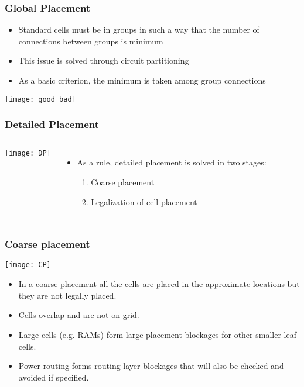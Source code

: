 \documentclass[compress]{beamer}
\begin{document}
\begin{frame}
	\frametitle{Global Placement}
	\begin{itemize}
		\item Standard cells must be in groups in such a way that the number of connections between groups is minimum
		\pause
		\item This issue is solved through circuit partitioning \pause
		\item As a basic criterion, the minimum is taken among group connections
	\end{itemize}
		\begin{center}
			\texttt{[image: good\_bad]}
		\end{center}
\end{frame}
\begin{frame}
	\frametitle{Detailed Placement}
	\begin{columns}	
		\begin{center}
			\texttt{[image: DP]}
		\end{center}
		\begin{itemize}
			\item As a rule, detailed placement is solved in two stages: 
			\begin{enumerate}
				\item Coarse placement
				\item Legalization of cell placement
			\end{enumerate}
		\end{itemize}
	\end{columns}
\end{frame}

\begin{frame}
	\frametitle{Coarse placement}
	\begin{center}
		\texttt{[image: CP]}
	\end{center}
\begin{itemize}
	\item In a coarse placement all the cells are placed in the approximate locations but they are not legally placed. 
	\item Cells overlap and are not on-grid. 
	\item Large cells (e.g. RAMs) form large placement blockages for other smaller leaf cells. 
	\item Power routing forms routing layer blockages that will also be checked and avoided if specified.
	
\end{itemize}
\end{frame}
\end{document}
